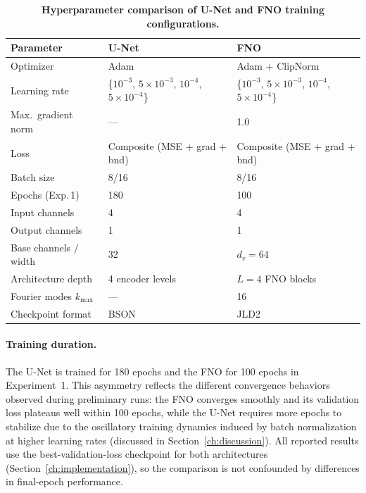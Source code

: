 \begin{table}[h]
\centering
\caption{\textbf{Hyperparameter comparison of U-Net and FNO training configurations.}}
\label{tab:hyperparams}
\begin{tabular}{lll}
\toprule
\textbf{Parameter}       & \textbf{U-Net}              & \textbf{FNO}                          \\
\midrule
Optimizer                & Adam                        & Adam + ClipNorm                        \\
Learning rate            & \{$10^{-3}$, $5\!\times\!10^{-3}$, $10^{-4}$, $5\!\times\!10^{-4}$\} & \{$10^{-3}$, $5\!\times\!10^{-3}$, $10^{-4}$, $5\!\times\!10^{-4}$\} \\
Max.\ gradient norm      & ---                         & 1.0                                    \\
Loss                     & Composite (MSE + grad + bnd) & Composite (MSE + grad + bnd)           \\
Batch size               & 8/16                           & 8/16                                     \\
Epochs (Exp.\,1)         & 180                       & 100                                   \\
Input channels           & 4                           & 4                                      \\
Output channels          & 1                           & 1                                      \\
Base channels / width    & 32                          & $d_v = 64$                             \\
Architecture depth       & 4 encoder levels            & $L = 4$ FNO blocks                     \\
Fourier modes $k_{\max}$ & ---                         & 16                                     \\
Checkpoint format        & BSON                        & JLD2                                   \\
\bottomrule
\end{tabular}
\end{table}

\paragraph{Training duration.}
The U-Net is trained for 180 epochs and the FNO for 100 epochs in Experiment~1. This asymmetry reflects the different convergence behaviors observed during preliminary runs: the FNO converges smoothly and its validation loss plateaus well within 100 epochs, while the U-Net requires more epochs to stabilize due to the oscillatory training dynamics induced by batch normalization at higher learning rates (discussed in Section~\ref{ch:discussion}). All reported results use the best-validation-loss checkpoint for both architectures (Section~\ref{ch:implementation}), so the comparison is not confounded by differences in final-epoch performance.

